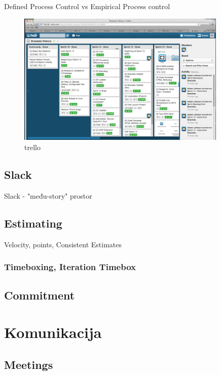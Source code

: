 \documentclass[lmodern, utf8, zavrsni]{fit}
\begin{document}
Defined Process Control vs Empirical Process control\citep{agiletransition}


\begin{figure}[H]
\centering
\includegraphics[width=10cm]{img/brackets_trello_sprint_history.png}
\caption{trello}
\end{figure}

\section{Slack}

Slack - "među-story" prostor\citep[str. 275]{agileart}

\section{Estimating}

Velocity, points,  Consistent Estimates

\subsection{Timeboxing, Iteration Timebox}

\section{Commitment}


\chapter{Komunikacija}

\section{Meetings}
\end{document}
